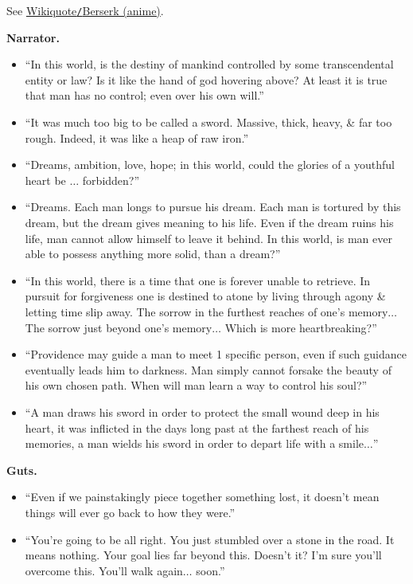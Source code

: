 \documentclass{article}
\begin{document}
\begin{enumerate}
    See \href{https://en.wikiquote.org/wiki/Berserk_(anime)}{Wikiquote{\tt/}Berserk (anime)}.
    
    {\bf Narrator.}
   	\begin{itemize}
   		\item ``In this world, is the destiny of mankind controlled by some transcendental entity or law? Is it like the hand of god hovering above? At least it is true that man has no control; even over his own will.''
   		\item ``It was much too big to be called a sword. Massive, thick, heavy, \& far too rough. Indeed, it was like a heap of raw iron.''
   		\item ``Dreams, ambition, love, hope; in this world, could the glories of a youthful heart be $\ldots$ forbidden?''
   		\item ``Dreams. Each man longs to pursue his dream. Each man is tortured by this dream, but the dream gives meaning to his life. Even if the dream ruins his life, man cannot allow himself to leave it behind. In this world, is man ever able to possess anything more solid, than a dream?''
   		\item ``In this world, there is a time that one is forever unable to retrieve. In pursuit for forgiveness one is destined to atone by living through agony \& letting time slip away. The sorrow in the furthest reaches of one's memory$\ldots$ The sorrow just beyond one's memory$\ldots$ Which is more heartbreaking?''
   		\item ``Providence may guide a man to meet 1 specific person, even if such guidance eventually leads him to darkness. Man simply cannot forsake the beauty of his own chosen path. When will man learn a way to control his soul?''
   		\item ``A man draws his sword in order to protect the small wound deep in his heart, it was inflicted in the days long past at the farthest reach of his memories, a man wields his sword in order to depart life with a smile$\ldots$''
   	\end{itemize}
    {\bf Guts.}
    \begin{itemize}
    	\item ``Even if we painstakingly piece together something lost, it doesn't mean things will ever go back to how they were.''
    	\item ``You're going to be all right. You just stumbled over a stone in the road. It means nothing. Your goal lies far beyond this. Doesn't it? I'm sure you'll overcome this. You'll walk again$\ldots$ soon.''

\end{itemize}
\end{enumerate}
\end{document}
